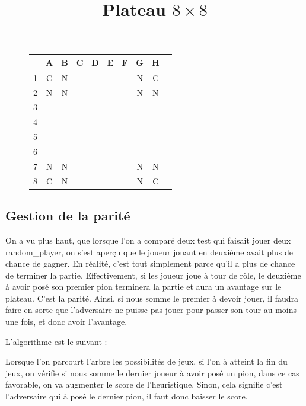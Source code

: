 \documentclass{report}
\begin{document}
\begin{figure}[!h]
\begin{center}
\renewcommand{\arraystretch} {1.5}
    \begin{tabular}{c|c|c|c|c|c|c|c|c|c|}
          &A & B & C & D & E & F & G & H \\
        \hline
        1 & C & N & & & & & N & C\\
        \hline
        2 & N & N & & & & & N & N \\
        \hline
        3 & & & & & & & & \\
        \hline
        4 & & & & & & & & \\
        \hline
        5 & & & & & & & & \\
        \hline
        6 & & & & & & & & \\
        \hline
        7 & N & N & & & & & N & N \\
        \hline
        8 & C & N & & & & & N & C \\
        \hline
    \end{tabular}


\end{center}
\begin{center}
    \title{Plateau $8\times8$}
\end{center}
\end{figure}


\subsection{Gestion de la parité}

On a vu plus haut, que lorsque l'on a comparé deux test qui faisait jouer deux random\_player, on s'est aperçu que le joueur jouant en deuxième avait plus de chance de gagner. En réalité, c'est tout simplement parce qu'il a plus de chance de terminer la partie. Effectivement, si les joueur joue à tour de rôle, le deuxième à avoir posé son premier pion terminera la partie et aura un avantage sur le plateau. C'est la parité. Ainsi, si nous somme le premier à devoir jouer, il faudra faire en sorte que l'adversaire ne puisse pas jouer pour passer son tour au moins une fois, et donc avoir l'avantage.

L'algorithme est le suivant :

Lorsque l'on parcourt l'arbre les possibilités de jeux, si l'on à atteint la fin du jeux, on vérifie si nous somme le dernier joueur à avoir posé un pion, dans ce cas favorable, on va augmenter le score de l'heuristique. Sinon, cela signifie c'est l'adversaire qui à posé le dernier pion, il faut donc baisser le score.
\end{document}
